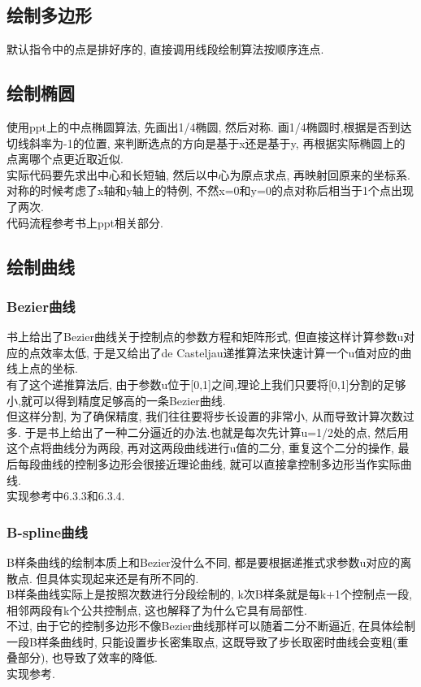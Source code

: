 \documentclass[a4paper,UTF8]{article}
\theoremstyle{definition}
\begin{document}
\subsection{绘制多边形}
默认指令中的点是排好序的, 直接调用线段绘制算法按顺序连点.

\subsection{绘制椭圆}
\indent 使用ppt上的中点椭圆算法, 先画出1/4椭圆, 然后对称. 画1/4椭圆时,根据是否到达切线斜率为-1的位置, 来判断选点的方向是基于x还是基于y, 再根据实际椭圆上的点离哪个点更近取近似.\\
\indent 实际代码要先求出中心和长短轴, 然后以中心为原点求点, 再映射回原来的坐标系.\\
\indent 对称的时候考虑了x轴和y轴上的特例, 不然x=0和y=0的点对称后相当于1个点出现了两次.\\
\indent 代码流程参考书上ppt相关部分.

\subsection{绘制曲线}
\subsubsection{Bezier曲线} 
书上给出了Bezier曲线关于控制点的参数方程和矩阵形式, 但直接这样计算参数u对应的点效率太低, 于是又给出了de Casteljau递推算法来快速计算一个u值对应的曲线上点的坐标.\\
\indent 有了这个递推算法后, 由于参数u位于[0,1]之间,理论上我们只要将[0,1]分割的足够小,就可以得到精度足够高的一条Bezier曲线.\\
\indent 但这样分割, 为了确保精度, 我们往往要将步长设置的非常小, 从而导致计算次数过多. 于是书上给出了一种二分逼近的办法.也就是每次先计算u=1/2处的点, 然后用这个点将曲线分为两段, 再对这两段曲线进行u值的二分, 重复这个二分的操作, 最后每段曲线的控制多边形会很接近理论曲线, 就可以直接拿控制多边形当作实际曲线.\\
\indent 实现参考\cite{sun_2006}中6.3.3和6.3.4.
\subsubsection{B-spline曲线}
B样条曲线的绘制本质上和Bezier没什么不同, 都是要根据递推式求参数u对应的离散点. 但具体实现起来还是有所不同的.\\
\indent B样条曲线实际上是按照次数进行分段绘制的, k次B样条就是每k+1个控制点一段, 相邻两段有k个公共控制点, 这也解释了为什么它具有局部性.\\
\indent 不过, 由于它的控制多边形不像Bezier曲线那样可以随着二分不断逼近, 在具体绘制一段B样条曲线时, 只能设置步长密集取点, 这既导致了步长取密时曲线会变粗(重叠部分), 也导致了效率的降低.\\
\indent 实现参考\cite{bspline_web}.
\end{document}
